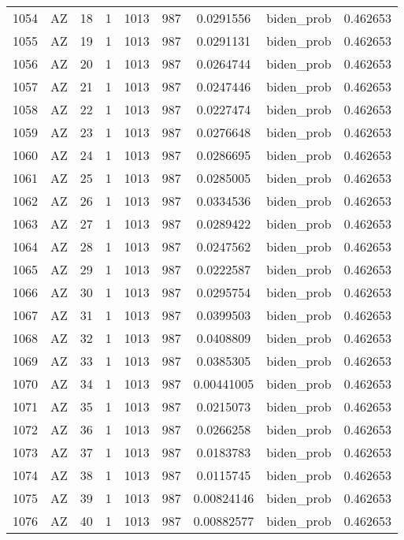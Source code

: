 \documentclass[12pt,a4paper]{article}
\begin{document}
\begin{tabular}{r|cccccccc}
	1054 & AZ & 18 & 1 & 1013 & 987 & 0.0291556 & biden\_prob & 0.462653 \\
	1055 & AZ & 19 & 1 & 1013 & 987 & 0.0291131 & biden\_prob & 0.462653 \\
	1056 & AZ & 20 & 1 & 1013 & 987 & 0.0264744 & biden\_prob & 0.462653 \\
	1057 & AZ & 21 & 1 & 1013 & 987 & 0.0247446 & biden\_prob & 0.462653 \\
	1058 & AZ & 22 & 1 & 1013 & 987 & 0.0227474 & biden\_prob & 0.462653 \\
	1059 & AZ & 23 & 1 & 1013 & 987 & 0.0276648 & biden\_prob & 0.462653 \\
	1060 & AZ & 24 & 1 & 1013 & 987 & 0.0286695 & biden\_prob & 0.462653 \\
	1061 & AZ & 25 & 1 & 1013 & 987 & 0.0285005 & biden\_prob & 0.462653 \\
	1062 & AZ & 26 & 1 & 1013 & 987 & 0.0334536 & biden\_prob & 0.462653 \\
	1063 & AZ & 27 & 1 & 1013 & 987 & 0.0289422 & biden\_prob & 0.462653 \\
	1064 & AZ & 28 & 1 & 1013 & 987 & 0.0247562 & biden\_prob & 0.462653 \\
	1065 & AZ & 29 & 1 & 1013 & 987 & 0.0222587 & biden\_prob & 0.462653 \\
	1066 & AZ & 30 & 1 & 1013 & 987 & 0.0295754 & biden\_prob & 0.462653 \\
	1067 & AZ & 31 & 1 & 1013 & 987 & 0.0399503 & biden\_prob & 0.462653 \\
	1068 & AZ & 32 & 1 & 1013 & 987 & 0.0408809 & biden\_prob & 0.462653 \\
	1069 & AZ & 33 & 1 & 1013 & 987 & 0.0385305 & biden\_prob & 0.462653 \\
	1070 & AZ & 34 & 1 & 1013 & 987 & 0.00441005 & biden\_prob & 0.462653 \\
	1071 & AZ & 35 & 1 & 1013 & 987 & 0.0215073 & biden\_prob & 0.462653 \\
	1072 & AZ & 36 & 1 & 1013 & 987 & 0.0266258 & biden\_prob & 0.462653 \\
	1073 & AZ & 37 & 1 & 1013 & 987 & 0.0183783 & biden\_prob & 0.462653 \\
	1074 & AZ & 38 & 1 & 1013 & 987 & 0.0115745 & biden\_prob & 0.462653 \\
	1075 & AZ & 39 & 1 & 1013 & 987 & 0.00824146 & biden\_prob & 0.462653 \\
	1076 & AZ & 40 & 1 & 1013 & 987 & 0.00882577 & biden\_prob & 0.462653 \\

\end{tabular}
\end{document}
